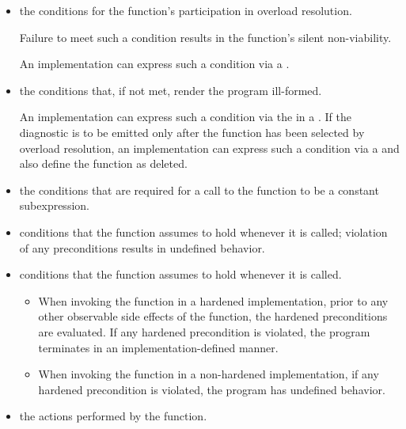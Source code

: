 \begin{itemize}
\item
\constraints
the conditions for the function's participation
in overload resolution.
\begin{note}
Failure to meet such a condition results in the function's silent non-viability.
\end{note}
\begin{example}
An implementation can express such a condition
via a .
\end{example}

\item
\mandates
the conditions that, if not met, render the program ill-formed.
\begin{example}
An implementation can express such a condition
via the 
in a .
If the diagnostic is to be emitted only after the function
has been selected by overload resolution,
an implementation can express such a condition
via a 
and also define the function as deleted.
\end{example}

\item
\constantwhen
the conditions that are required for a call to the function
to be a constant subexpression.

\item
\expects
conditions that the function assumes to hold whenever it is called;
violation of any preconditions results in undefined behavior.

\item
\hardexpects
conditions that the function assumes to hold whenever it is called.
\begin{itemize}
\item
When invoking the function in a hardened implementation,
prior to any other observable side effects of the function,
the hardened preconditions are evaluated.
If any hardened precondition is violated,
the program terminates in an implementation-defined manner.
\item
When invoking the function in a non-hardened implementation,
if any hardened precondition is violated,
the program has undefined behavior.
\end{itemize}

\item
\effects
the actions performed by the function.


\end{itemize}
